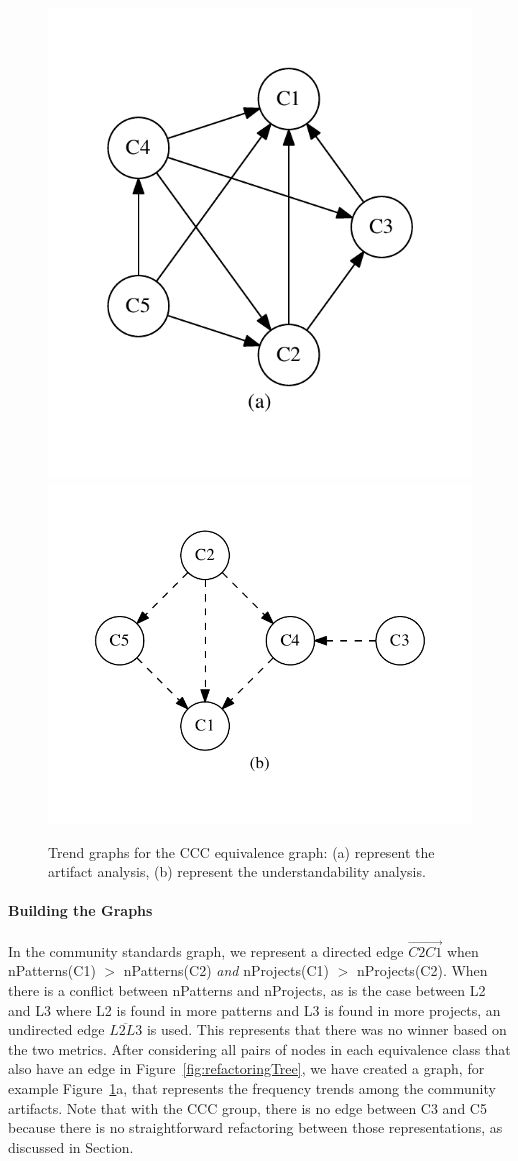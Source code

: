 \begin{figure}[tb]
\centering
\includegraphics[width=0.42\columnwidth]{nontex/graphs/cart.pdf}\includegraphics[width=0.57\columnwidth]{nontex/graphs/ccom.pdf}
\vspace{-12pt}
\caption{Trend graphs for the CCC equivalence graph: (a) represent the artifact analysis, (b) represent the understandability analysis.}

\label{fig:graphsforanalysis}
\end{figure}


\paragraph{Building the Graphs}
In the community standards graph, we represent a directed edge  $\overrightarrow{C2  C1}$ when  nPatterns(C1) $>$ nPatterns(C2) \emph{and}  nProjects(C1) $>$ nProjects(C2).
When there is a conflict between nPatterns and nProjects, as is the case between L2 and L3 where L2 is found in more patterns and L3 is found in more projects, an undirected edge $\overline{L2L3}$ is used.
This represents that there was no winner based on the two metrics.
After considering all pairs of nodes in each equivalence class that also have an edge in Figure~\ref{fig:refactoringTree}, we have created a graph, for example Figure~\ref{fig:graphsforanalysis}a, that represents the frequency trends among the community artifacts.
Note that with the CCC group, there is no edge between C3 and C5 because there is no straightforward refactoring between those representations, as discussed in Section.

